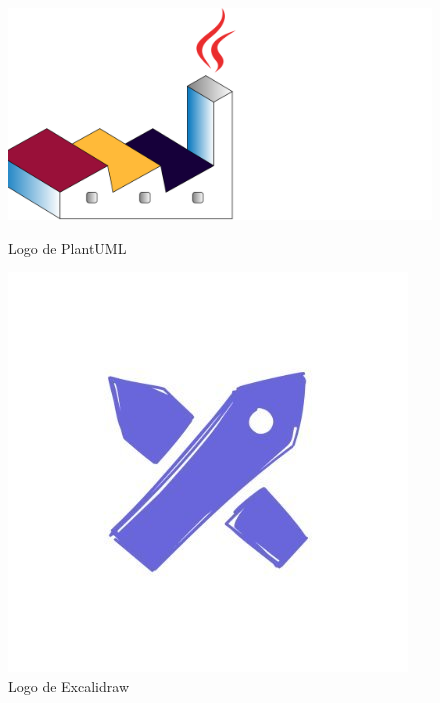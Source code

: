 \begin{figure}[H]
    \centering
    \begin{minipage}{0.2\textwidth}
        \centering
        \includegraphics[width=\textwidth]{figures/7-Construccion/PlantUML.png}
        \caption{Logo de PlantUML}
    \end{minipage}
    \hspace{0.05\textwidth}
    \begin{minipage}{0.2\textwidth}
        \centering
        \includegraphics[width=\textwidth]{figures/7-Construccion/Exacalidraw.jpeg}
        \caption{Logo de Excalidraw}
    \end{minipage}
\end{figure}


